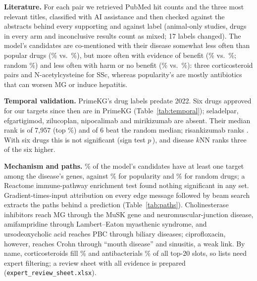 \documentclass[journal]{IEEEtran}
\begin{document}
\textbf{Literature.} For each pair we retrieved PubMed hit counts and the three most relevant titles, classified with AI assistance and then checked against the abstracts behind every supporting and against label (animal-only studies, drugs in every arm and inconclusive results count as mixed; 17 labels changed). The model's candidates are co-mentioned with their disease somewhat less often than popular drugs (\ValLitHitModel\% vs.\ \ValLitHitPop\%), but more often with evidence of benefit (\ValLitSupModel\% vs.\ \ValLitSupPop\%; random \ValLitSupRand\%) and less often with harm or no benefit (\ValLitAgainstModel\% vs.\ \ValLitAgainstPop\%): three corticosteroid pairs and N-acetylcysteine for SSc, whereas popularity's are mostly antibiotics that can worsen MG or induce hepatitis.

\textbf{Temporal validation.} PrimeKG's drug labels predate 2022. Six drugs approved for our targets since then are in PrimeKG (Table~\ref{tab:temporal}); seladelpar, efgartigimod, zilucoplan, nipocalimab and mirikizumab are absent. Their median rank is \TempPostMedRank{} of 7,957 (top \TempPostMedPct\%) and \TempPostBetter{} of 6 beat the random median; risankizumab ranks \TempRankRisankizumab. With six drugs this is not significant (sign test $p$\,\TempPostP), and disease $k$NN ranks three of the six higher.

\begin{table}[!t]
\centering
\caption{Ranks among 7,957 drugs of drugs approved after the PrimeKG snapshot (top) and of earlier approvals missing from its labels (bottom). FDA: approval month; Rank: \sysname, mean over three seeds; $k$NN, Pop.: disease $k$NN and popularity. Drugs that treat no training disease score zero in both baselines and share their random tie-break, hence equal ranks.}
\label{tab:temporal}
\scriptsize
\setlength{\tabcolsep}{2.5pt}

\end{table}

\textbf{Mechanism and paths.} \ValDisGeneModel\% of the model's candidates have at least one target among the disease's genes, against \ValDisGenePop\% for popularity and \ValDisGeneRand\% for random drugs; a Reactome immune-pathway enrichment test found nothing significant in any set. Gradient-times-input attribution on every edge message followed by beam search~\cite{zhu2021nbfnet} extracts the paths behind a prediction (Table~\ref{tab:paths}). Cholinesterase inhibitors reach MG through the MuSK gene and neuromuscular-junction disease, amifampridine through Lambert--Eaton myasthenic syndrome, and ursodeoxycholic acid reaches PBC through biliary diseases; ciprofloxacin, however, reaches Crohn through ``mouth disease'' and sinusitis, a weak link. By name, corticosteroids fill \ValSteroidShare\% and antibacterials \ValAntibioticShare\% of all top-20 slots, so lists need expert filtering; a review sheet with all evidence is prepared (\texttt{expert\_review\_sheet.xlsx}).
\end{document}
